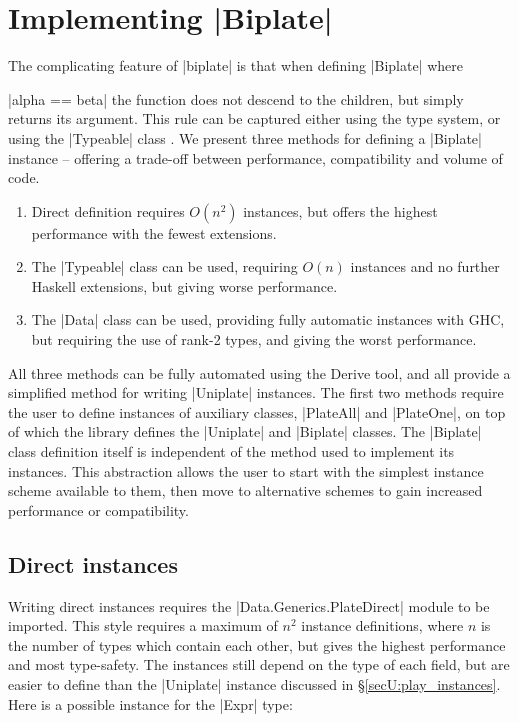 \section{Implementing |Biplate|}
\label{secU:implement_playex}


The complicating feature of |biplate| is that when defining |Biplate| where \ignore|alpha == beta| the function does not descend to the children, but simply returns its argument. This rule can be captured either using the type system, or using the |Typeable| class \cite{lammel:syb}. We present three methods for defining a |Biplate| instance -- offering a trade-off between performance, compatibility and volume of code.

\begin{enumerate}
\item Direct definition requires $O(n^2)$ instances, but offers the highest performance with the fewest extensions.
\item The |Typeable| class can be used, requiring $O(n)$ instances and no further Haskell extensions, but giving worse performance.
\item The |Data| class can be used, providing fully automatic instances with GHC, but requiring the use of rank-2 types, and giving the worst performance.
\end{enumerate}

All three methods can be fully automated using the Derive tool, and all provide a simplified method for writing |Uniplate| instances. The first two methods require the user to define instances of auxiliary classes, |PlateAll| and |PlateOne|, on top of which the library defines the |Uniplate| and |Biplate| classes. The |Biplate| class definition itself is independent of the method used to implement its instances. This abstraction allows the user to start with the simplest instance scheme available to them, then move to alternative schemes to gain increased performance or compatibility.


\subsection{Direct instances}
\label{secU:implement_playdirect}

Writing direct instances requires the |Data.Generics.PlateDirect| module to be imported. This style requires a maximum of $n^2$ instance definitions, where $n$ is the number of types which contain each other, but gives the highest performance and most type-safety. The instances still depend on the type of each field, but are easier to define than the |Uniplate| instance discussed in \S\ref{secU:play_instances}. Here is a possible instance for the |Expr| type:

